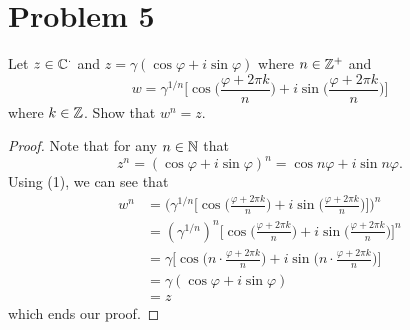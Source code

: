 \documentclass[a4paper]{article}
\begin{document}
    \section*{Problem 5} Let \( z \in \mathbb{C}^{\cdot} \) and \( z = \gamma ( \cos \varphi + i \sin \varphi)\) where \( n \in \mathbb{Z}^{+}  \) and  
        \[  w = \gamma^{1/n} \Bigg[ \cos \Big(  \frac{ \varphi + 2 \pi k  }{ n  } \Big)  + i \sin \Big(  \frac{ \varphi + 2 \pi k  }{ n  }  \Big)\Bigg]  \]
        where \( k \in \mathbb{Z}  \). Show that \( w^{n} = z  \).
        \begin{proof}
        Note that for any \( n \in \mathbb{N}  \) that 
        \[ z^{n} = ( \cos \varphi + i \sin \varphi )^{n} = \cos n \varphi + i \sin n \varphi.   \tag{1}  \]
        Using (1), we can see that 
        \begin{align*}
            w^{n} &= \Bigg(  \gamma^{1/n} \Bigg[  \cos \Bigg(  \frac{ \varphi + 2 \pi k  }{ n  } \Big)  + i \sin \Big(  \frac{ \varphi + 2 \pi k  }{ n  }  \Big) \Bigg] \Bigg)^{n} \\
                  &= (\gamma^{1/n})^{n} \Bigg[ \cos \Big(  \frac{ \varphi + 2 \pi k  }{ n  } \Big)  + i \sin \Big(  \frac{ \varphi + 2 \pi k  }{ n  }  \Big) \Bigg]^{n} \\
                  &= \gamma \Bigg[ \cos \Big( n \cdot  \frac{ \varphi + 2 \pi k  }{ n }  \Big) + i \sin \Big(  n \cdot \frac{  \varphi + 2 \pi k  }{ n  }  \Big) \Bigg] \\   
                  &= \gamma (\cos \varphi + i \sin \varphi) \\
                  &= z
        \end{align*}
        which ends our proof.
        \end{proof}
\end{document}
